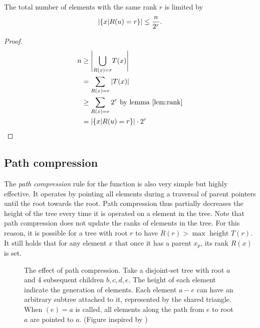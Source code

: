 \begin{lemma}\label{lem:noderank}
  The total number of elements with the same rank $r$ is limited by 
  \begin{equation}
      \abs{\{x | R(u)=r \}} \leq \frac{n}{2^r}.
  \end{equation}
\end{lemma}
\begin{proof}
    \begin{align*}
        n &\geq \Bigg| \underset{R(x)=r}{\bigcup} T(x) \Bigg| \\
        &= \sum_{R(x)=r} \abs{T(x)} \\
        &\geq \sum_{R(x)=r} 2^r \text{ by lemma \ref{lem:rank}}\\
        &= \abs{\{x | R(u)=r\}}\cdot 2^r
    \end{align*}
\end{proof}

\subsection{Path compression}
The \emph{path compression} rule for the  function is also very simple but highly effective. It operates by pointing all elements during a traversal of parent pointers until the root towards the root. Path compression thus partially decreases the height of the tree every time it is operated on a element in the tree. Note that path compression does not update the ranks of elements in the tree. For this reason, it is possible for a tree with root $r$ to have $R(r) > \max \text{ height } T(r)$. It still holds that for any element $x$ that once it has a parent $x_p$, its rank $R(x)$ is set. 

\newcommand\DRAWTREE[3]{
  \node[fnode] at (#1,#2) (#3) {$#3$};
  \draw[lw1, fill=white!80!black] (#3.south) -- +(0.3,-1) -- +(-0.3,-1) -- cycle;
}
\begin{figure}[h]
  \centering
  \caption{The effect of path compression. Take a disjoint-set tree with root $a$ and 4 subsequent children $b,c,d,e$. The height of each element indicate the generation of elements. Each element $a-e$ can have an arbitrary subtree attached to it, represented by the shared triangle. When $(e)=a$ is called, all elements along the path from $e$ to root $a$ are pointed to $a$. (Figure inspired by \cite{tarjan1975efficiency})}
  \label{fig:pathcompression}
\end{figure}

